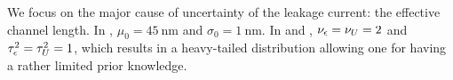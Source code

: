 We focus on the major cause of uncertainty of the leakage current: the effective channel length. In , $\mu_0 = 45~\text{nm}$ and $\sigma_0 = 1~\text{nm}$. In  and , $\nu_\epsilon = \nu_U = 2$ and $\tau^2_\epsilon = \tau^2_U = 1$, which results in a heavy-tailed distribution allowing one for having a rather limited prior knowledge.
